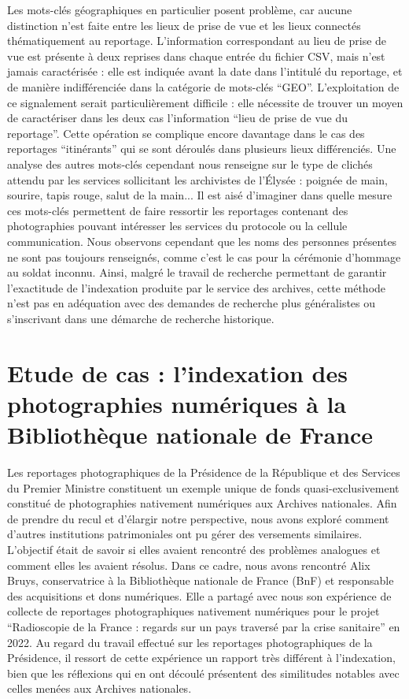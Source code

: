 Les mots-clés géographiques en particulier posent problème, car aucune distinction n'est faite entre les lieux de prise de vue et les lieux connectés thématiquement au reportage. L'information correspondant au lieu de prise de vue est présente à deux reprises dans chaque entrée du fichier CSV, mais n'est jamais caractérisée : elle est indiquée avant la date dans l'intitulé du reportage, et de manière indifférenciée dans la catégorie de mots-clés \enquote{GEO}.  L'exploitation de ce signalement serait particulièrement difficile : elle nécessite de trouver un moyen de caractériser dans les deux cas l'information \enquote{lieu de prise de vue du reportage}. Cette opération se complique encore davantage dans le cas des reportages \enquote{itinérants} qui se sont déroulés dans plusieurs lieux différenciés. Une analyse des autres mots-clés cependant nous renseigne sur le type de clichés attendu par les services sollicitant les archivistes de l'Élysée : poignée de main, sourire, tapis rouge, salut de la main... Il est aisé d'imaginer dans quelle mesure ces mots-clés permettent de faire ressortir les reportages contenant des photographies pouvant intéresser les services du protocole ou la cellule communication. Nous observons cependant que les noms des personnes présentes ne sont pas toujours renseignés, comme c'est le cas pour la cérémonie d'hommage au soldat inconnu. Ainsi, malgré le travail de recherche permettant de garantir l'exactitude de l'indexation produite par le service des archives, cette méthode n'est pas en adéquation avec des demandes de recherche plus généralistes ou s'inscrivant dans une démarche de recherche historique.

\section{Etude de cas : l'indexation des photographies numériques à la Bibliothèque nationale de France}

Les reportages photographiques de la Présidence de la République et des Services du Premier Ministre constituent un exemple unique de fonds quasi-exclusivement constitué de photographies nativement numériques aux Archives nationales. Afin de prendre du recul et d’élargir notre perspective, nous avons exploré comment d’autres institutions patrimoniales ont pu gérer des versements similaires. L’objectif était de savoir si elles avaient rencontré des problèmes analogues et comment elles les avaient résolus. Dans ce cadre, nous avons rencontré Alix Bruys, conservatrice à la Bibliothèque nationale de France (BnF) et responsable des acquisitions et dons numériques. Elle a partagé avec nous son expérience de collecte de reportages photographiques nativement numériques pour le projet \enquote{Radioscopie de la France : regards sur un pays traversé par la crise sanitaire} en 2022. Au regard du travail effectué sur les reportages photographiques de la Présidence, il ressort de cette expérience un rapport très différent à l'indexation, bien que les réflexions qui en ont découlé présentent des similitudes notables avec celles menées aux Archives nationales.

